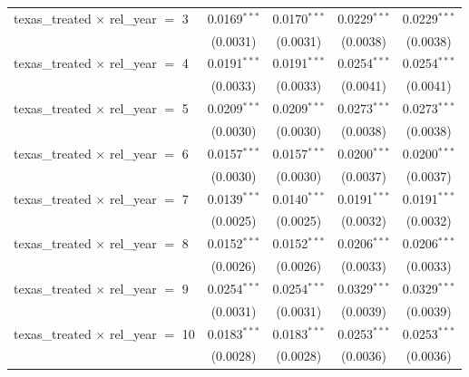 \begin{tabular}{lcccc}
   texas\_treated $\times$ rel\_year $=$ 3      & 0.0169$^{***}$ & 0.0170$^{***}$        & 0.0229$^{***}$  & 0.0229$^{***}$\\   
                                                & (0.0031)       & (0.0031)              & (0.0038)        & (0.0038)\\   
   texas\_treated $\times$ rel\_year $=$ 4      & 0.0191$^{***}$ & 0.0191$^{***}$        & 0.0254$^{***}$  & 0.0254$^{***}$\\   
                                                & (0.0033)       & (0.0033)              & (0.0041)        & (0.0041)\\   
   texas\_treated $\times$ rel\_year $=$ 5      & 0.0209$^{***}$ & 0.0209$^{***}$        & 0.0273$^{***}$  & 0.0273$^{***}$\\   
                                                & (0.0030)       & (0.0030)              & (0.0038)        & (0.0038)\\   
   texas\_treated $\times$ rel\_year $=$ 6      & 0.0157$^{***}$ & 0.0157$^{***}$        & 0.0200$^{***}$  & 0.0200$^{***}$\\   
                                                & (0.0030)       & (0.0030)              & (0.0037)        & (0.0037)\\   
   texas\_treated $\times$ rel\_year $=$ 7      & 0.0139$^{***}$ & 0.0140$^{***}$        & 0.0191$^{***}$  & 0.0191$^{***}$\\   
                                                & (0.0025)       & (0.0025)              & (0.0032)        & (0.0032)\\   
   texas\_treated $\times$ rel\_year $=$ 8      & 0.0152$^{***}$ & 0.0152$^{***}$        & 0.0206$^{***}$  & 0.0206$^{***}$\\   
                                                & (0.0026)       & (0.0026)              & (0.0033)        & (0.0033)\\   
   texas\_treated $\times$ rel\_year $=$ 9      & 0.0254$^{***}$ & 0.0254$^{***}$        & 0.0329$^{***}$  & 0.0329$^{***}$\\   
                                                & (0.0031)       & (0.0031)              & (0.0039)        & (0.0039)\\   
   texas\_treated $\times$ rel\_year $=$ 10     & 0.0183$^{***}$ & 0.0183$^{***}$        & 0.0253$^{***}$  & 0.0253$^{***}$\\   
                                                & (0.0028)       & (0.0028)              & (0.0036)        & (0.0036)\\   

\end{tabular}
